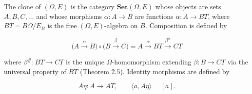 The clone of $(\Omega, E)$ is the category $\mathbf{Set}(\Omega, E)$ whose objects are sets $A, B, C, \ldots$ and whose morphisms $\alpha: A \longrightarrow B$ are functions $\alpha: A \to BT$, where $BT = B\Omega/E_B$ is the free $(\Omega, E)$-algebra on $B$. Composition is defined by

$$
\bigl(A \xrightarrow{\alpha} B\bigr) \circ \bigl(B \xrightarrow{\beta} C\bigr) = A \xrightarrow{\alpha} BT \xrightarrow{\beta^{\#}} CT
$$

where $\beta^{\#}: BT \to CT$ is the unique $\Omega$-homomorphism extending $\beta: B \to CT$ via the universal property of $BT$ (Theorem 2.5). Identity morphisms are defined by

$$
A\eta: A \longrightarrow AT, \qquad \langle a, A\eta\rangle = [a].
$$
